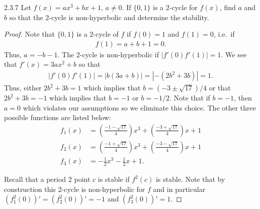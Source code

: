 \begin{problem}{2.3.7}
  Let $f(x) = ax^3 + bx + 1$, $a\neq 0$. If $\{0, 1\}$ is a 2-cycle for $f(x)$,
  find $a$ and $b$ so that the 2-cycle is non-hyperbolic and determine the stability.
\end{problem}

\begin{proof}
  Note that $\{0, 1\}$ is a 2-cycle of $f$ if $f(0) = 1$ and $f(1) = 0$, i.e.\ if
  \begin{align*}
    f(1) = a + b + 1 = 0.
  \end{align*}
  Thus, $a = -b - 1.$
  The 2-cycle is non-hyperbolic if $\left|f'(0)f'(1)\right| = 1$. We see that
  $f'(x) = 3a x^2 + b$ so that
  \begin{align*}
    \left|f'(0)f'(1)\right| = |b(3a + b)| = |-(2b^2 + 3b)| = 1.
  \end{align*}
  Thus, either $2b^2 + 3b = 1$ which implies that $b=(-3\pm\sqrt{17})/4$ or
  that $2b^2 + 3b = -1$ which implies that $b=-1$ or $b=-1/2$. Note that if $b=-1$, then $a = 0$ which violates our
  assumptions
  so we eliminate this choice. The other three possible functions are listed below:
  \begin{align*}
    f_1(x) &= \left(\frac{-1 - \sqrt{17}}{4}\right)x^3 + \left(\frac{-3 + \sqrt{17}}{4}\right)x + 1 \\
    f_2(x) &= \left(\frac{-1 + \sqrt{17}}{4}\right)x^3 + \left(\frac{-3 - \sqrt{17}}{4}\right)x + 1 \\
    f_3(x) &= -\frac{1}{2} x^3 - \frac{1}{2} x + 1.
  \end{align*}

  Recall that a period 2 point $c$ is stable if $f^2(c)$ is stable. Note that by construction
  this 2-cycle is non-hyperbolic for $f$ and in particular $(f_1^2(0))' = (f_2^2(0))' = -1$
  and $(f_3^2(0))' = 1$.


\end{proof}
